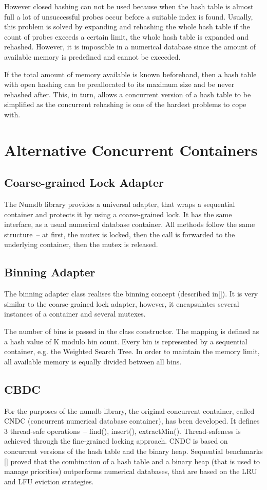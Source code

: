 However closed hashing can not be used because when the hash table is almost full a lot of unsuccessful probes occur before a suitable index is found. Usually, this problem is solved by expanding and rehashing the whole hash table if the count of probes exceeds a certain limit, the whole hash table is expanded and rehashed. However, it is impossible in a numerical database since the amount of available memory is predefined and cannot be exceeded.

If the total amount of memory available is known beforehand, then a hash table with open hashing can be preallocated to its maximum size and be never rehashed after. This, in turn, allows a concurrent version of a hash table to be simplified as the concurrent rehashing is one of the hardest problems to cope with.



\section{Alternative Concurrent Containers}

\subsection{Coarse-grained Lock Adapter}
The Numdb library provides a universal adapter, that wraps a sequential container and protects it by using a coarse-grained lock. It has the same interface, as a usual numerical database container. All methods follow the same structure~-- at first, the mutex is locked, then the call is forwarded to the underlying container, then the mutex is released.

\subsection{Binning Adapter}
The binning adapter class realises the binning concept (described in[]). It is very similar to the coarse-grained lock adapter, however, it encapsulates several instances of a container and several mutexes.

The number of bins is passed in the class constructor. The mapping is defined as a hash value of K modulo bin count. Every bin is represented by a sequential container, e.g. the Weighted Search Tree. In order to maintain the memory limit, all available memory is equally divided between all bins.

\subsection{CBDC}
For the purposes of the numdb library, the original concurrent container, called CNDC (concurrent numerical database container), has been developed. It defines 3 thread-safe operations~-- find(), insert(), extractMin(). Thread-safeness is achieved through the fine-grained locking approach. CNDC is based on concurrent versions of the hash table and the binary heap. Sequential benchmarks [] proved that the combination of a hash table and a binary heap (that is used to manage priorities) outperforms numerical databases, that are based on the LRU and LFU eviction strategies.

